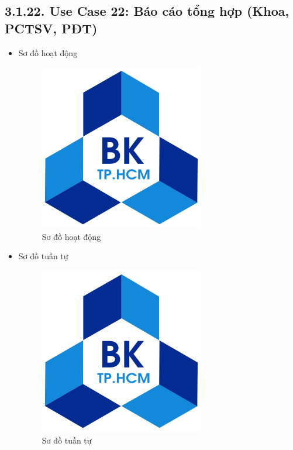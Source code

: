 \subsection*{3.1.22. Use Case 22: Báo cáo tổng hợp (Khoa, PCTSV, PĐT)}
\begin{itemize}
    \item Sơ đồ hoạt động
    \begin{figure}[H]
    \centering
    \includegraphics[scale=0.5 ]{Picture/hcmut.png}
    \caption{Sơ đồ hoạt động }
    \end{figure}
    \item Sơ đồ tuần tự
    \begin{figure}[H]
    \centering
    \includegraphics[scale=0.5 ]{Picture/hcmut.png}
    \caption{Sơ đồ tuần tự }
    \end{figure}
\end{itemize}

